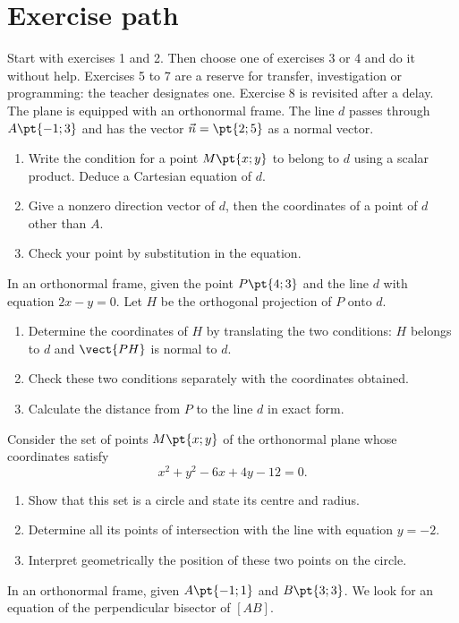 \section*{Exercise path}\label{C07-PARC}
Start with exercises 1 and 2. Then choose one of exercises 3 or 4 and do it without help. Exercises 5 to 7 are a reserve for transfer, investigation or programming: the teacher designates one. Exercise 8 is revisited after a delay.
\begingroup
{}
The plane is equipped with an orthonormal frame. The line $d$ passes through $A\pt{-1;3}$ and has the vector $\vec n=\pt{2;5}$ as a normal vector.
\begin{enumerate}[label=\arabic*.]
\item Write the condition for a point $M\pt{x;y}$ to belong to $d$ using a scalar product. Deduce a Cartesian equation of $d$.
\item Give a nonzero direction vector of $d$, then the coordinates of a point of $d$ other than $A$.
\item Check your point by substitution in the equation.
\end{enumerate}
In an orthonormal frame, given the point $P\pt{4;3}$ and the line $d$ with equation $2x-y=0$. Let $H$ be the orthogonal projection of $P$ onto $d$.
\begin{enumerate}[label=\arabic*.]
\item Determine the coordinates of $H$ by translating the two conditions: $H$ belongs to $d$ and $\vect{PH}$ is normal to $d$.
\item Check these two conditions separately with the coordinates obtained.
\item Calculate the distance from $P$ to the line $d$ in exact form.
\end{enumerate}
Consider the set of points $M\pt{x;y}$ of the orthonormal plane whose coordinates satisfy\[x^2+y^2-6x+4y-12=0.\]
\begin{enumerate}[label=\arabic*.]
\item Show that this set is a circle and state its centre and radius.
\item Determine all its points of intersection with the line with equation $y=-2$.
\item Interpret geometrically the position of these two points on the circle.
\end{enumerate}
In an orthonormal frame, given $A\pt{-1;1}$ and $B\pt{3;3}$. We look for an equation of the perpendicular bisector of $[AB]$.
